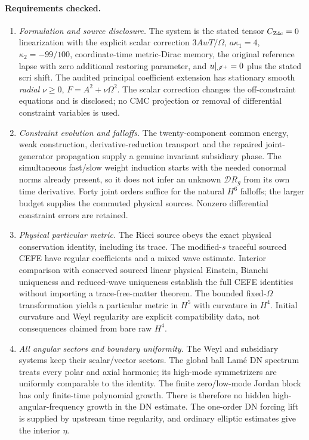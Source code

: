 \paragraph{Requirements checked.}
\begin{enumerate}
\item \emph{Formulation and source disclosure.}  The system is the stated
tensor $C_{\rm Z4c}=0$ linearization with the explicit scalar correction
$3AwT/\Omega$, $a\kappa_1=4$, $\kappa_2=-99/100$, coordinate-time
metric-Dirac memory, the original reference lapse with zero additional
restoring parameter, and $u|_{\mathscr I^+}=0$ plus the stated scri shift.
The audited principal coefficient extension has stationary smooth
\emph{radial} $\nu\ge0$, $F=A^2+\nu\Omega^2$.
The scalar correction changes the off-constraint equations and is disclosed;
no CMC projection or removal of differential constraint variables is used.

\item \emph{Constraint evolution and falloffs.}  The twenty-component common
energy, weak construction, derivative-reduction transport and the repaired
joint-generator propagation supply a genuine invariant subsidiary phase.
The simultaneous fast/slow weight induction starts with the needed
conormal norms already present, so it does not infer an unknown
$\mathcal DR_g$ from its own time derivative.  Forty joint orders suffice
for the natural $H^6$ falloffs; the larger budget supplies the commuted
physical sources.  Nonzero differential constraint errors are retained.

\item \emph{Physical particular metric.}  The Ricci source obeys the exact
physical conservation identity, including its trace.  The modified-$s$
traceful sourced CEFE have regular coefficients and a mixed wave estimate.
Interior comparison with conserved sourced linear physical Einstein,
Bianchi uniqueness and reduced-wave uniqueness establish the full CEFE
identities without importing a trace-free-matter theorem.  The bounded
fixed-$\Omega$ transformation yields a particular metric in $H^5$ with
curvature in $H^4$.  Initial curvature and Weyl regularity are explicit
compatibility data, not consequences claimed from bare raw $H^4$.

\item \emph{All angular sectors and boundary uniformity.}  The Weyl and
subsidiary systems keep their scalar/vector sectors.  The global ball
Lam\'e DN spectrum treats every polar and axial harmonic; its high-mode
symmetrizers are uniformly comparable to the identity.  The finite
zero/low-mode Jordan block has only finite-time polynomial growth.
There is therefore no hidden high-angular-frequency growth in the DN
estimate.  The one-order DN forcing lift is supplied by upstream time
regularity, and ordinary elliptic estimates give the interior $\eta$.


\end{enumerate}
